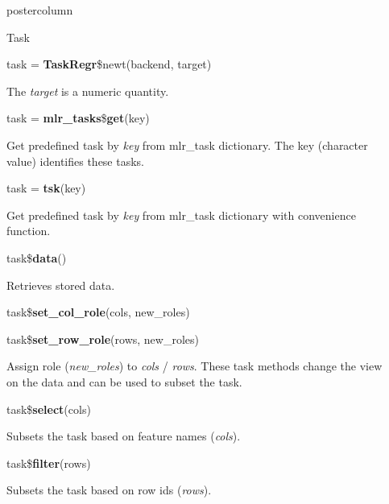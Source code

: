 \documentclass{beamer}
\begin{document}
\begin{frame}[fragile]{}
\begin{columns}
\begin{column}{.245\textwidth}
\begin{beamercolorbox}[center]{postercolumn}
\begin{minipage}{.98\textwidth}
{\begin{myblock}{Task}
							\\
							\begin{codebox}
								task = \textbf{TaskRegr}\$newt(backend, target)
							\end{codebox}
							The \textit{target} is a numeric quantity.
							\\
							\begin{codebox}
								task = \textbf{mlr\_tasks}\$\textbf{get}(key)
							\end{codebox}
							Get predefined task by \textit{key} from mlr\_task dictionary. The key (character value) identifies these tasks.
							\\
							\begin{codebox}
								task = \textbf{tsk}(key)
							\end{codebox}
							Get predefined task by \textit{key} from mlr\_task dictionary with convenience function.
							\\
							\begin{codebox}
								task\$\textbf{data}()
							\end{codebox}
							Retrieves stored data.
							\\
							\begin{codebox}
								task\$\textbf{set\_col\_role}(cols, new\_roles)
							\end{codebox}
							\begin{codebox}
								task\$\textbf{set\_row\_role}(rows, new\_roles)
							\end{codebox}
							Assign role (\textit{new\_roles}) to \textit{cols} / \textit{rows}. These task methods change the view on the data and can be used to subset the task.
							\\
							\begin{codebox}
								task\$\textbf{select}(cols)
							\end{codebox}
							Subsets the task based on feature names (\textit{cols}).
							\\
							\begin{codebox}
								task\$\textbf{filter}(rows)
							\end{codebox}
							Subsets the task based on row ids (\textit{rows}).
						\end{myblock}
						\vfill
					}
				\end{minipage}
			\end{beamercolorbox}
		\end{column}
		\begin{column}{.245\textwidth}

\end{column}
\end{columns}
\end{frame}
\end{document}
